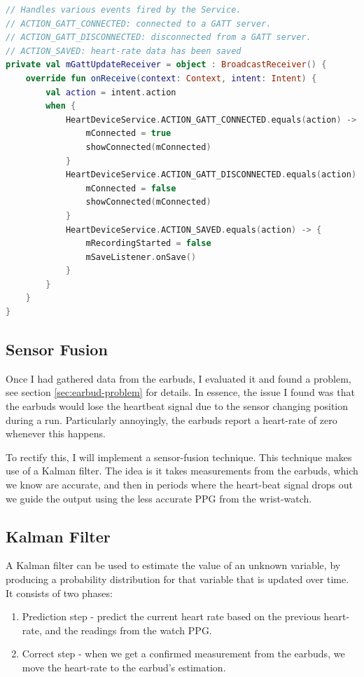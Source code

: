 \documentclass[12pt,a4paper,twoside,openany]{report}
\begin{document}
\begin{lstlisting}[language=Kotlin]
// Handles various events fired by the Service.
// ACTION_GATT_CONNECTED: connected to a GATT server.
// ACTION_GATT_DISCONNECTED: disconnected from a GATT server.
// ACTION_SAVED: heart-rate data has been saved
private val mGattUpdateReceiver = object : BroadcastReceiver() {
    override fun onReceive(context: Context, intent: Intent) {
        val action = intent.action
        when {
            HeartDeviceService.ACTION_GATT_CONNECTED.equals(action) -> {
                mConnected = true
                showConnected(mConnected)
            }
            HeartDeviceService.ACTION_GATT_DISCONNECTED.equals(action) -> {
                mConnected = false
                showConnected(mConnected)
            }
            HeartDeviceService.ACTION_SAVED.equals(action) -> {
                mRecordingStarted = false
                mSaveListener.onSave()
            }
        }
    }
}
\end{lstlisting}


\subsection{Sensor Fusion}

Once I had gathered data from the earbuds, I evaluated it and found a problem,
see section \ref{sec:earbud-problem} for details. In essence, the issue I
found was that the earbuds would lose the heartbeat signal due to the sensor
changing position during a run. Particularly annoyingly, the earbuds report a
heart-rate of zero whenever this happens. 

To rectify this, I will implement a sensor-fusion technique. This technique
makes use of a Kalman filter. The idea is it takes measurements from the earbuds, which
we know are accurate, and then in periods where the heart-beat signal drops
out we guide the output using the less accurate PPG from the wrist-watch.

\subsection{Kalman Filter}

A Kalman filter can be used to estimate the value of an unknown variable, by
producing a probability distribution for that variable that is updated over
time.
It consists of two phases:
\begin{enumerate}
	\item Prediction step - predict the current heart rate based on the
		previous heart-rate, and the readings from the watch PPG.

	\item Correct step - when we get a confirmed measurement from the
		earbuds, we move the heart-rate to the earbud's estimation.
\end{enumerate}
\end{document}
